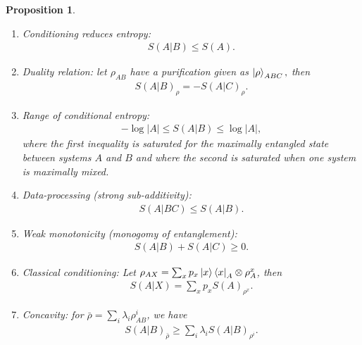 \documentclass[notoc]{tufte-book}
\newtheorem{proposition}[theorem]{Proposition}
\begin{document}
\begin{tcolorbox}[colframe=white,breakable, colback=black!5, arc=0pt, outer arc=0pt]
\begin{proposition}\label{prop:properties-conditional-entropy}
\begin{enumerate}
    \item Conditioning reduces entropy: \begin{align}S(A|B)\leq S(A).
    \end{align}
    \item Duality relation: let $\rho_{AB}$ have a purification given as $\ket{\rho}_{ABC},$ then \begin{align}
        S(A|B)_{\rho} = -S(A|C)_{\rho}.
    \end{align}
    \item Range of conditional entropy: \begin{align}
        -\log{|A|}\leq S(A|B) \leq \log{|A|},
    \end{align} where the first inequality is saturated for the maximally entangled state between systems $A$ and $B$ and where the second is saturated when one system is maximally mixed.
    \item Data-processing (strong sub-additivity):
    \begin{align}
        S(A|BC)\leq S(A|B).
    \end{align}
    \item Weak monotonicity (monogomy of entanglement):
    \begin{align}
        S(A|B)+S(A|C) \geq 0.
    \end{align}
    \item Classical conditioning: Let $\rho_{AX}=\sum_x p_x \ket{x}\bra{x}_A \otimes \rho_A^x$, then
    \begin{align}
        S(A|X) =\sum_x p_x S(A)_{\rho^x}.
    \end{align}
    \item Concavity: for $\bar{\rho}=\sum_i \lambda_i \rho_{AB}^i$, we have 
    \begin{align}
        S(A|B)_{\bar{\rho}} \geq \sum_i \lambda_i S(A|B)_{\rho^i}.
    \end{align}
\end{enumerate}
\end{proposition}
\end{tcolorbox}
\end{document}

